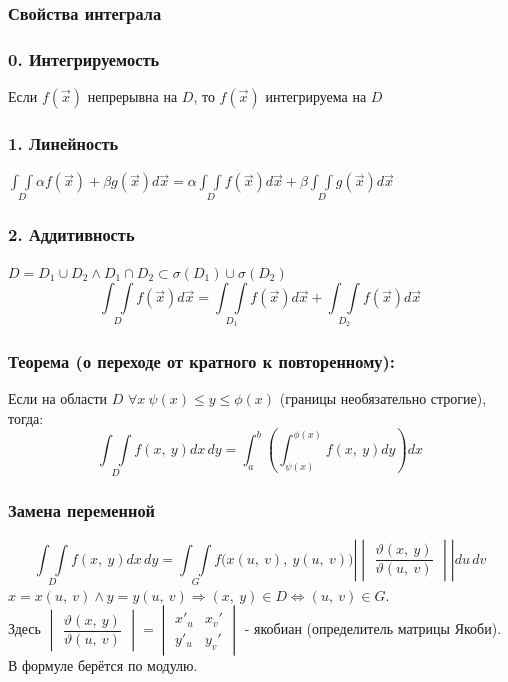 \documentclass[12pt, letterpaper, twoside]{article}
\newcommand{\DS}{\displaystyle}
\begin{document}
    \subsubsection*{Свойства интеграла}
    \subsubsection*{0. Интегрируемость}
    Если $f(\vec{x})$ непрерывна на $D$, то $f(\vec{x})$ интегрируема на $D$
    \subsubsection*{1. Линейность}
    $\DS \underset{D}{\int\int} \alpha f(\vec{x}) + \beta g(\vec{x})d\vec{x} = \alpha \underset{D}{\int\int} f(\vec{x}) d\vec{x} + \beta \underset{D}{\int\int} g(\vec{x}) d\vec{x}$
    \subsubsection*{2. Аддитивность}
    $D = D_1\cup D_2\wedge D_1\cap D_2 \subset \sigma(D_1) \cup \sigma(D_2)$
    \[\underset{D}{\int\int} f(\vec{x}) d\vec{x} = \underset{D_1}{\int\int} f(\vec{x}) d\vec{x} + \underset{D_2}{\int\int} f(\vec{x}) d\vec{x}\]

    \subsubsection*{Теорема (о переходе от кратного к повторенному):}
    Если на области $D$ $\forall x\ \psi(x) \leq y \leq \phi(x)$ (границы необязательно строгие), тогда:
    \[\DS \underset{D}{\int\int} f(x,\ y)dx\, dy = \int_a^b\left( \int_{\psi(x)}^{\phi(x)} f(x,\ y) dy \right) dx\]

    \subsubsection*{Замена переменной}
    \[\underset{D}{\int\int} f(x,\ y)dx\, dy = \underset{G}{\int\int}f\big( x(u,\ v),\ y(u,\ v)\big)\left|\begin{vmatrix}
        \dfrac{\vartheta(x,\ y)}{\vartheta(u,\ v)}
    \end{vmatrix}\right|du\, dv\]
    $x = x(u,\ v)\wedge y = y(u,\ v)\Rightarrow (x,\ y)\in D \Leftrightarrow (u,\ v)\in G$.\\
    Здесь $\begin{vmatrix}
        \dfrac{\vartheta(x,\ y)}{\vartheta(u,\ v)}
    \end{vmatrix} = \begin{vmatrix}
        x'_u & x_v'\\
        y'_u & y_v'
    \end{vmatrix}$ - якобиан (определитель матрицы Якоби). В формуле берётся по модулю.
\end{document}
